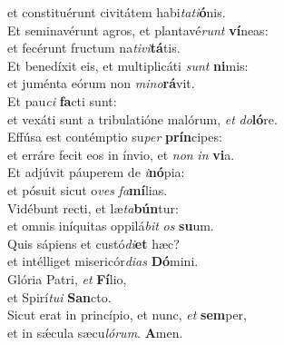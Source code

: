 \evenverse et constituérunt civitátem habi\textit{ta}\textit{ti}\textbf{ó}nis.\\
\oddverse Et seminavérunt agros, et plantavé\textit{runt} \textbf{ví}neas:~\*\\
\oddverse et fecérunt fructum na\textit{ti}\textit{vi}\textbf{tá}tis.\\
\evenverse Et benedíxit eis, et multiplicáti \textit{sunt} \textbf{ni}mis:~\*\\
\evenverse et juménta eórum non \textit{mi}\textit{no}\textbf{rá}vit.\\
\oddverse Et pau\textit{ci} \textbf{fa}cti sunt:~\*\\
\oddverse et vexáti sunt a tribulatióne malórum, \textit{et} \textit{do}\textbf{ló}re.\\
\evenverse Effúsa est contémptio su\textit{per} \textbf{prín}cipes:~\*\\
\evenverse et erráre fecit eos in ínvio, et \textit{non} \textit{in} \textbf{vi}a.\\
\oddverse Et adjúvit páuperem de \textit{i}\textbf{nó}pia:~\*\\
\oddverse et pósuit sicut o\textit{ves} \textit{fa}\textbf{mí}lias.\\
\evenverse Vidébunt recti, et læ\textit{ta}\textbf{bún}tur:~\*\\
\evenverse et omnis iníquitas oppilá\textit{bit} \textit{os} \textbf{su}um.\\
\oddverse Quis sápiens et custó\textit{di}\textbf{et} hæc?~\*\\
\oddverse et intélliget misericór\textit{di}\textit{as} \textbf{Dó}mini.\\
\evenverse Glória Patri, \textit{et} \textbf{Fí}lio,~\*\\
\evenverse et Spirí\textit{tu}\textit{i} \textbf{San}cto.\\
\oddverse Sicut erat in princípio, et nunc, \textit{et} \textbf{sem}per,~\*\\
\oddverse et in sǽcula sæcu\textit{ló}\textit{rum}. \textbf{A}men.\\
